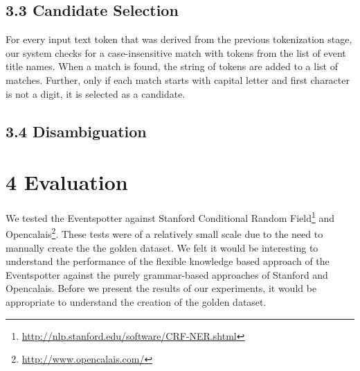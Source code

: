 \documentclass[a4paper,11pt]{report}
\begin{document}

\section*{3.3 Candidate Selection}

For every input text token that was derived from the previous tokenization stage, our system checks for a case-insensitive match with tokens from the list of event title names. When a match is found, the string of tokens are added to a list of matches. Further, only if each match starts with capital letter and first character is not a digit, it is selected as a candidate.

\section*{3.4 Disambiguation}





\chapter*{4 Evaluation}
We tested the Eventspotter against Stanford Conditional Random Field\footnote{\url{http://nlp.stanford.edu/software/CRF-NER.shtml}} and Opencalais\footnote{\url{http://www.opencalais.com/}}. These tests were of a relatively small scale due to the need to manually create the the golden dataset. We felt it would be interesting to understand the performance of the flexible knowledge based approach of the Eventspotter against the purely grammar-based approaches of Stanford and Opencalais. Before we present the results of our experiments, it would be appropriate to understand the creation of the golden dataset. 
\end{document}

